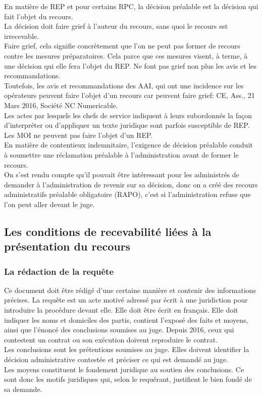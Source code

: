 \documentclass[10pt, a4paper, openany]{book}
\begin{document}
En matière de REP et pour certains RPC, la décision préalable est la décision qui fait l'objet du recours. \\
La décision doit faire grief à l'auteur du recours, sans quoi le recours est irrecevable. \\
Faire grief, cela signifie concrètement que l'on ne peut pas former de recours contre les mesures préparatoires. Cela parce que ces mesures visent, à terme, à une décision qui elle fera l'objet du REP. Ne font pas grief non plus les avis et les recommandations. \\
Toutefois, les avis et recommandations des AAI, qui ont une incidence sur les opérateurs peuvent faire l'objet d'un recours car peuvent faire grief: CE, Ass., 21 Mars 2016, Société NC Numericable.\\
Les actes par lesquels les chefs de service indiquent à leurs subordonnés la façon d'interpréter ou d'appliquer un texte juridique sont parfois susceptible de REP. \\
Les MOI ne peuvent pas faire l'objet d'un REP. \\
En matière de contentieux indemnitaire, l'exigence de décision préalable conduit à soumettre une réclamation préalable à l'administration avant de former le recours. \\
On s'est rendu compte qu'il pouvait être intéressant pour les administrés de demander à l'administration de revenir sur sa décision, donc on a créé des recours administratifs préalable obligatoire (RAPO), c'est si l'administration refuse que l'on peut aller devant le juge. 

\subsection{Les conditions de recevabilité liées à la présentation du recours}

\subsubsection{La rédaction de la requête}

Ce document doit être rédigé d'une certaine manière et contenir des informations précises. La requête est un acte motivé adressé par écrit à une juridiction pour introduire la procédure devant elle. Elle doit être écrit en français. Elle doit indiquer les noms et domiciles des partis, contient l'exposé des faits et moyens, ainsi que l'énoncé des conclusions soumises au juge. Depuis 2016, ceux qui contestent un contrat ou son exécution doivent reproduire le contrat. \\
Les conclusions sont les prétentions soumises au juge. Elles doivent identifier la décision administrative contestée et préciser ce qui est demandé au juge. \\
Les moyens constituent le fondement juridique au soutien des conclusions. Ce sont donc les motifs juridiques qui, selon le requérant, justifient le bien fondé de sa demande.
\end{document}

